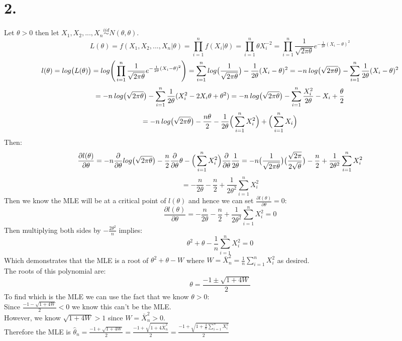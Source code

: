 \documentclass{article}
\begin{document}
\newpage
\section*{2.}
\begin{center}
\doublespacing
    Let $\theta > 0$ then let $X_1, X_2, ..., X_n\overset{iid}{\sim} N(\theta, \theta)$.
    \[L (\theta) = f(X_1, X_2, ..., X_n |\theta) =\prod_{i=1}^n f(X_i |\theta) =\prod_{i=1}^n\theta X_i^{-2} =\prod_{i=1}^n\frac{1}{\sqrt{2\pi\theta}} e^{-\frac{1}{2\theta}(X_i -\theta)^2}\]
    \[l (\theta) = log\big{(}L(\theta)\big{)} = log\Bigg{(}\prod_{i=1}^n\frac{1}{\sqrt{2\pi\theta}} e^{-\frac{1}{2\theta}(X_i -\theta)^2}\Bigg{)} =\sum_{i=1}^n log\big{(}\frac{1}{\sqrt{2\pi\theta}}\big{)} -\frac{1}{2\theta}(X_i -\theta)^2 = -n\:log\big{(}\sqrt{2\pi\theta}\big{)} -\sum_{i=1}^n\frac{1}{2\theta}(X_i -\theta)^2\]
    \[= -n\:log\big{(}\sqrt{2\pi\theta}\big{)} -\sum_{i=1}^n \frac{1}{2\theta}(X_i^2 - 2X_i\theta +\theta^2) = -n\:log\big{(}\sqrt{2\pi\theta}\big{)} -\sum_{i=1}^n \frac{X_i^2}{2\theta} - X_i +\frac{\theta}{2}\]
    \[= -n\:log\big{(}\sqrt{2\pi\theta}\big{)} -\frac{n\theta}{2} -\frac{1}{2\theta}\Big{(}\sum_{i=1}^n X_i^2\Big{)} + \Big{(}\sum_{i=1}^n X_i\Big{)}\]
    Then:
    \[\frac{\partial l(\theta)}{\partial\theta} = - n\frac{\partial}{\partial\theta} log\big{(}\sqrt{2\pi\theta}\big{)} -\frac{n}{2}\frac{\partial}{\partial\theta}\theta -\Big{(}\sum_{i=1}^n X_i^2\Big{)}\frac{\partial}{\partial\theta}\frac{1}{2\theta} = -n\big{(}\frac{1}{\sqrt{2\pi\theta}}\big{)}\big{(}\frac{\sqrt{2\pi}}{2\sqrt{\theta}}\big{)} -\frac{n}{2} +\frac{1}{2\theta^2}\sum_{i=1}^n X_i^2\]
    \[= -\frac{n}{2\theta} -\frac{n}{2} +\frac{1}{2\theta^2}\sum_{i=1}^n X_i^2\]
    Then we know the MLE will be at a critical point of $l(\theta)$ and hence we can set $\frac{\partial l(\theta)}{\partial\theta} = 0$:
    \[\frac{\partial l(\theta)}{\partial\theta} = -\frac{n}{2\theta} -\frac{n}{2} +\frac{1}{2\theta^2}\sum_{i=1}^n X_i^2 = 0\]
    Then multiplying both sides by $-\frac{2\theta^2}{n}$ implies:
    \[\theta^2 +\theta -\frac{1}{n}\sum_{i=1}^n X_i^2 = 0\]
    Which demonstrates that the MLE is a root of $\theta^2 +\theta - W$ where $W =\bar{X}_n^2 =\frac{1}{n}\sum_{i=1}^n X_i^2$ as desired.
    \\The roots of this polynomial are:
    \[\theta =\frac{-1\pm\sqrt{1+4W}}{2}\]
    To find which is the MLE we can use the fact that we know $\theta > 0$:
    \\Since $\frac{-1 -\sqrt{1 + 4W}}{2} < 0$ we know this can't be the MLE.
    \break
    \\However, we know $\sqrt{1 + 4W} > 1$ since $W =\bar{X}_n^2 > 0$.
    \break
    \\Therefore the MLE is $\hat{\theta}_n =\frac{-1 +\sqrt{1 + 4W}}{2} =\frac{-1 +\sqrt{1 + 4\bar{X}_n^2}}{2} =\frac{-1 +\sqrt{1 +\frac{4}{n}\sum_{i=1}^n X_i^2}}{2}$ \qedsymbol
\end{center}
\end{document}
